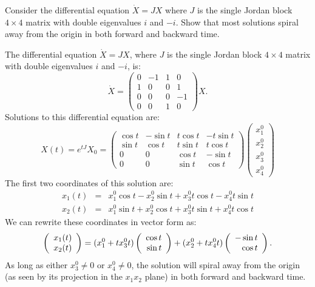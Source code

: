 \documentclass{ximera}
\begin{document}
\begin{exercise} \label{c11.1.3B}
Consider the differential equation $\dot{X}=JX$ where $J$ is the single Jordan 
block $4\times 4$ matrix with double eigenvalues $i$ and $-i$.  Show that most 
solutions spiral away from the origin in both forward and backward time.

\begin{solution}
The differential equation $\dot{X}=JX$, where $J$ is the 
single Jordan block $4\times 4$ matrix with double eigenvalues $i$ and $-i$,
is:
\[
\dot{X} = \left(\begin{array}{rr|rr}
 0 & -1 & 1 &  0 \\
 1 &  0 & 0 &  1 \\
\hline
 0 &  0 & 0 & -1\\
 0 &  0 & 1 &  0
\end{array}\right)X.  
\]
Solutions to this differential equation are:
\[
X(t) = e^{tJ}X_0 = \left(\begin{array}{rrrr}
  \cos t & -\sin t & t\cos t & -t\sin t\\
  \sin t &  \cos t & t\sin t &  t\cos t\\
     0   &    0    &  \cos t &  -\sin t\\
     0   &    0    &  \sin t &   \cos t  
\end{array}\right)
\left(\begin{array}{r} x_1^0 \\  x_2^0 \\ x_3^0 \\ x_4^0 \end{array}\right)
\]
The first two coordinates of this solution are:
\begin{eqnarray*}
x_1(t) & = & x_1^0\cos t - x_2^0\sin t + x_3^0t\cos t - x_4^0t\sin t\\
x_2(t) & = & x_1^0\sin t + x_2^0\cos t + x_3^0t\sin t + x_4^0t\cos t
\end{eqnarray*}
We can rewrite these coordinates in vector form as:
\[
\left(\begin{array}{r} x_1(t) \\ x_2(t)\end{array}\right) =
(x_1^0 + tx_3^0t)\left(\begin{array}{r} \cos t \\ \sin t\end{array}\right) + 
(x_2^0 + tx_4^0t)\left(\begin{array}{r} -\sin t \\ \cos t\end{array}\right).
\] 
As long as either $x_3^0\neq 0$ or $x_4^0\neq 0$, the solution will spiral 
away from the origin (as seen by its projection in the $x_1x_2$ plane) in 
both forward and backward time.

\end{solution}
\end{exercise} 
\end{document}
